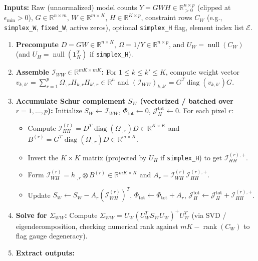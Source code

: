 \documentclass[11pt,a4paper]{article}
\theoremstyle{plain}
\theoremstyle{definition}
\theoremstyle{remark}
\newcommand{\R}{\mathbb{R}}
\newcommand{\E}{\mathcal{E}}
\newcommand{\cI}{\mathcal{I}}
\newcommand{\diag}{\operatorname{diag}}
\newcommand{\rank}{\operatorname{rank}}
\newcommand{\one}{\mathbf{1}}
\newcommand{\kron}{\otimes}
\newcommand{\pinv}{^{+}}
\begin{document}
\begin{tcolorbox}[colback=gray!4!white,colframe=gray!60!black,title={Algorithm: Exact $\mathcal{O}(p)$ Uncertainty Evaluation for \texttt{espm}},breakable]
\label{box:algo}
\textbf{Inputs:} Raw (unnormalized) model counts $Y = GWH \in \R_{>0}^{n\times p}$ (clipped at $\epsilon_{\min} > 0$), $G \in \R^{n\times m}$, $W \in \R^{m\times K}$, $H \in \R^{K\times p}$, constraint rows $C_W$ (e.g., \texttt{simplex\_W}, \texttt{fixed\_W}, active zeros), optional \texttt{simplex\_H} flag, element index list $\E$.
\begin{enumerate}[leftmargin=1.5em]
    \item \textbf{Precompute} $D = GW \in \R^{n \times K}$, $\Omega = 1 / Y \in \R^{n \times p}$, and $U_W = \operatorname{null}(C_W)$ (and $U_H = \operatorname{null}(\one_K^T)$ if \texttt{simplex\_H}).
    \item \textbf{Assemble $\cI_{WW} \in \R^{mK \times mK}$:} For $1 \le k \le k' \le K$, compute weight vector $v_{k,k'} = \sum_{r=1}^p \Omega_{\cdot, r} H_{k,r} H_{k',r} \in \R^n$ and $(\cI_{WW})_{k,k'} = G^T \diag(v_{k,k'}) G$.
    \item \textbf{Accumulate Schur complement $S_W$ (vectorized / batched over $r=1,\dots,p$):} Initialize $S_W \leftarrow \cI_{WW}$, $\Phi_{\text{tot}} \leftarrow 0$, $\mathcal{J}_H^{\text{tot}} \leftarrow 0$. For each pixel $r$:
    \begin{itemize}[leftmargin=1.2em]
        \item Compute $\cI_{HH}^{(r)} = D^T \diag(\Omega_{\cdot, r}) D \in \R^{K\times K}$ and $B^{(r)} = G^T \diag(\Omega_{\cdot, r}) D \in \R^{m \times K}$.
        \item Invert the $K\times K$ matrix (projected by $U_H$ if \texttt{simplex\_H}) to get $\cI_{HH}^{(r),+}$.
        \item Form $\cI_{WH}^{(r)} = h_{\cdot, r} \kron B^{(r)} \in \R^{mK \times K}$ and $A_r = \cI_{WH}^{(r)} \cI_{HH}^{(r),+}$.
        \item Update $S_W \leftarrow S_W - A_r (\cI_{WH}^{(r)})^T$, $\Phi_{\text{tot}} \leftarrow \Phi_{\text{tot}} + A_r$, $\mathcal{J}_H^{\text{tot}} \leftarrow \mathcal{J}_H^{\text{tot}} + \cI_{HH}^{(r),+}$.
    \end{itemize}
    \item \textbf{Solve for $\Sigma_{WW}$:} Compute $\Sigma_{WW} = U_W (U_W^T S_W U_W)\pinv U_W^T$ (via SVD / eigendecomposition, checking numerical rank against $mK - \rank(C_W)$ to flag gauge degeneracy).
    \item \textbf{Extract outputs:}

\end{enumerate}
\end{tcolorbox}
\end{document}
